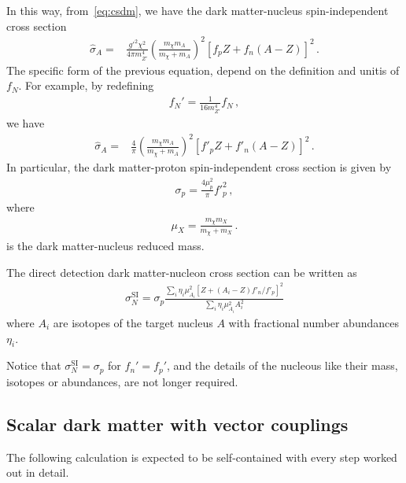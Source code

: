In this way, from~\eqref{eq:csdm}, we have the dark matter-nucleus
spin-independent cross section~\cite{Feng:2013vod}
\begin{align}
       \hat{\sigma}_A
                    =&\frac{{g'}^2 \chi^2}{4\pi m_{Z'}^4}\left( \frac{m_\chi m_A}{m_\chi+m_A} \right)^2\left[f_p Z + f_n (A-Z)\right]^2\,.
\end{align}
The specific form of the previous equation, depend on the definition and unitis of $f_N$. For example, by redefining
\begin{align}
  f_N'=\frac{1}{16 m_{Z'}^4}f_N\,,
\end{align}
we have~\cite{Yaguna:2016bga}
\begin{align}
       \hat{\sigma}_A
                    =&\frac{4}{\pi}\left( \frac{m_\chi m_A}{m_\chi+m_A} \right)^2\left[f'_p Z + f'_n (A-Z)\right]^2\,.
\end{align}
In particular, the dark matter-proton spin-independent cross
section is given by
\begin{align}
  \sigma_{p}=\frac{4 \mu_{p}^{2}}{\pi} {f'}_{p}^{2}\,,
\end{align}
where
\begin{align}
  \mu_X=\frac{m_{\chi}m_X}{m_{\chi}+m_X}\,.
\end{align}
is the dark matter-nucleus reduced mass.

The direct detection dark matter-nucleon cross section can be written as
\begin{align}
  \sigma_{N}^{\text{SI}}=\sigma_{p} \frac{\sum_{i} \eta_{i} \mu_{A_{i}}^{2}\left[Z+\left(A_{i}-Z\right) f'_{n} / f'_{p}\right]^{2}}{\sum_{i} \eta_{i} \mu_{A_{i}}^{2} A_{i}^{2}}
\end{align}
where $A_i$ are isotopes of the target nucleus $A$ with fractional number abundances $\eta_i$.

Notice that $\sigma_{N}^{\text{SI}}=\sigma_{p}$ for $f_n'=f_p'$, and the details of the nucleous like their mass, isotopes or abundances, are not longer required.


\subsection{Scalar dark matter with vector couplings}

The following calculation is expected to be self-contained with every step worked out in detail.

